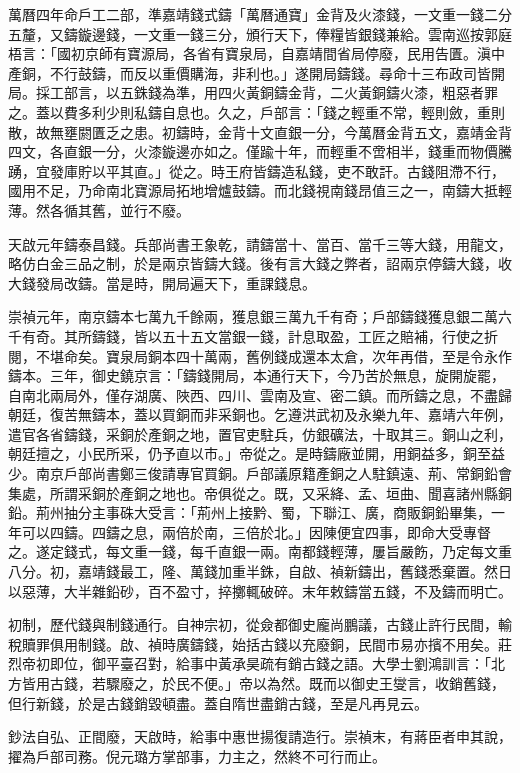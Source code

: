 萬曆四年命戶工二部，準嘉靖錢式鑄「萬曆通寶」金背及火漆錢，一文重一錢二分五釐，又鑄鏇邊錢，一文重一錢三分，頒行天下，俸糧皆銀錢兼給。雲南巡按郭庭梧言：「國初京師有寶源局，各省有寶泉局，自嘉靖間省局停廢，民用告匱。滇中產銅，不行鼓鑄，而反以重價購海，非利也。」遂開局鑄錢。尋命十三布政司皆開局。採工部言，以五銖錢為準，用四火黃銅鑄金背，二火黃銅鑄火漆，粗惡者罪之。蓋以費多利少則私鑄自息也。久之，戶部言：「錢之輕重不常，輕則斂，重則散，故無壅閼匱乏之患。初鑄時，金背十文直銀一分，今萬曆金背五文，嘉靖金背四文，各直銀一分，火漆鏇邊亦如之。僅踰十年，而輕重不啻相半，錢重而物價騰踴，宜發庫貯以平其直。」從之。時王府皆鑄造私錢，吏不敢訐。古錢阻滯不行，國用不足，乃命南北寶源局拓地增爐鼓鑄。而北錢視南錢昂值三之一，南鑄大抵輕薄。然各循其舊，並行不廢。

天啟元年鑄泰昌錢。兵部尚書王象乾，請鑄當十、當百、當千三等大錢，用龍文，略仿白金三品之制，於是兩京皆鑄大錢。後有言大錢之弊者，詔兩京停鑄大錢，收大錢發局改鑄。當是時，開局遍天下，重課錢息。

崇禎元年，南京鑄本七萬九千餘兩，獲息銀三萬九千有奇；戶部鑄錢獲息銀二萬六千有奇。其所鑄錢，皆以五十五文當銀一錢，計息取盈，工匠之賠補，行使之折閱，不堪命矣。寶泉局銅本四十萬兩，舊例錢成還本太倉，次年再借，至是令永作鑄本。三年，御史鐃京言：「鑄錢開局，本通行天下，今乃苦於無息，旋開旋罷，自南北兩局外，僅存湖廣、陜西、四川、雲南及宣、密二鎮。而所鑄之息，不盡歸朝廷，復苦無鑄本，蓋以買銅而非采銅也。乞遵洪武初及永樂九年、嘉靖六年例，遣官各省鑄錢，采銅於產銅之地，置官吏駐兵，仿銀礦法，十取其三。銅山之利，朝廷擅之，小民所采，仍予直以市。」帝從之。是時鑄廠並開，用銅益多，銅至益少。南京戶部尚書鄭三俊請專官買銅。戶部議原籍產銅之人駐鎮遠、荊、常銅鉛會集處，所謂采銅於產銅之地也。帝俱從之。既，又采絳、孟、垣曲、聞喜諸州縣銅鉛。荊州抽分主事硃大受言：「荊州上接黔、蜀，下聯江、廣，商販銅鉛畢集，一年可以四鑄。四鑄之息，兩倍於南，三倍於北。」因陳便宜四事，即命大受專督之。遂定錢式，每文重一錢，每千直銀一兩。南都錢輕薄，屢旨嚴飭，乃定每文重八分。初，嘉靖錢最工，隆、萬錢加重半銖，自啟、禎新鑄出，舊錢悉棄置。然日以惡薄，大半雜鉛砂，百不盈寸，捽擲輒破碎。末年敕鑄當五錢，不及鑄而明亡。

初制，歷代錢與制錢通行。自神宗初，從僉都御史龐尚鵬議，古錢止許行民間，輸稅贖罪俱用制錢。啟、禎時廣鑄錢，始括古錢以充廢銅，民間市易亦擯不用矣。莊烈帝初即位，御平臺召對，給事中黃承昊疏有銷古錢之語。大學士劉鴻訓言：「北方皆用古錢，若驟廢之，於民不便。」帝以為然。既而以御史王燮言，收銷舊錢，但行新錢，於是古錢銷毀頓盡。蓋自隋世盡銷古錢，至是凡再見云。

鈔法自弘、正間廢，天啟時，給事中惠世揚復請造行。崇禎末，有蔣臣者申其說，擢為戶部司務。倪元璐方掌部事，力主之，然終不可行而止。

